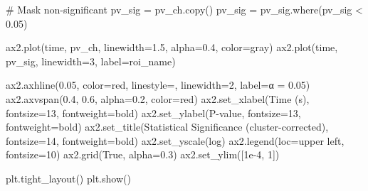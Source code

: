 \documentclass[
  11pt,
  letterpaper,
  oneside,
  openany]{book}
\newenvironment{Shaded}{\begin{snugshade}}{\end{snugshade}}
\newcommand{\CommentTok}[1]{\textcolor[rgb]{0.37,0.37,0.37}{#1}}
\newcommand{\DecValTok}[1]{\textcolor[rgb]{0.68,0.00,0.00}{#1}}
\newcommand{\FloatTok}[1]{\textcolor[rgb]{0.68,0.00,0.00}{#1}}
\newcommand{\NormalTok}[1]{\textcolor[rgb]{0.00,0.23,0.31}{#1}}
\newcommand{\OperatorTok}[1]{\textcolor[rgb]{0.37,0.37,0.37}{#1}}
\newcommand{\StringTok}[1]{\textcolor[rgb]{0.13,0.47,0.30}{#1}}
\newcommand{\VariableTok}[1]{\textcolor[rgb]{0.07,0.07,0.07}{#1}}
\begin{document}
\begin{Shaded}
\begin{Highlighting}[]
    \CommentTok{\# Mask non{-}significant}
\NormalTok{    pv\_sig }\OperatorTok{=}\NormalTok{ pv\_ch.copy()}
\NormalTok{    pv\_sig }\OperatorTok{=}\NormalTok{ pv\_sig.where(pv\_sig }\OperatorTok{\textless{}} \FloatTok{0.05}\NormalTok{)}
    
\NormalTok{    ax2.plot(time, pv\_ch, linewidth}\OperatorTok{=}\FloatTok{1.5}\NormalTok{, alpha}\OperatorTok{=}\FloatTok{0.4}\NormalTok{, color}\OperatorTok{=}\StringTok{\textquotesingle{}gray\textquotesingle{}}\NormalTok{)}
\NormalTok{    ax2.plot(time, pv\_sig, linewidth}\OperatorTok{=}\DecValTok{3}\NormalTok{, label}\OperatorTok{=}\NormalTok{roi\_name)}

\NormalTok{ax2.axhline(}\FloatTok{0.05}\NormalTok{, color}\OperatorTok{=}\StringTok{\textquotesingle{}red\textquotesingle{}}\NormalTok{, linestyle}\OperatorTok{=}\StringTok{\textquotesingle{}{-}{-}\textquotesingle{}}\NormalTok{, linewidth}\OperatorTok{=}\DecValTok{2}\NormalTok{, label}\OperatorTok{=}\StringTok{\textquotesingle{}α = 0.05\textquotesingle{}}\NormalTok{)}
\NormalTok{ax2.axvspan(}\FloatTok{0.4}\NormalTok{, }\FloatTok{0.6}\NormalTok{, alpha}\OperatorTok{=}\FloatTok{0.2}\NormalTok{, color}\OperatorTok{=}\StringTok{\textquotesingle{}red\textquotesingle{}}\NormalTok{)}
\NormalTok{ax2.set\_xlabel(}\StringTok{\textquotesingle{}Time (s)\textquotesingle{}}\NormalTok{, fontsize}\OperatorTok{=}\DecValTok{13}\NormalTok{, fontweight}\OperatorTok{=}\StringTok{\textquotesingle{}bold\textquotesingle{}}\NormalTok{)}
\NormalTok{ax2.set\_ylabel(}\StringTok{\textquotesingle{}P{-}value\textquotesingle{}}\NormalTok{, fontsize}\OperatorTok{=}\DecValTok{13}\NormalTok{, fontweight}\OperatorTok{=}\StringTok{\textquotesingle{}bold\textquotesingle{}}\NormalTok{)}
\NormalTok{ax2.set\_title(}\StringTok{\textquotesingle{}Statistical Significance (cluster{-}corrected)\textquotesingle{}}\NormalTok{, fontsize}\OperatorTok{=}\DecValTok{14}\NormalTok{, fontweight}\OperatorTok{=}\StringTok{\textquotesingle{}bold\textquotesingle{}}\NormalTok{)}
\NormalTok{ax2.set\_yscale(}\StringTok{\textquotesingle{}log\textquotesingle{}}\NormalTok{)}
\NormalTok{ax2.legend(loc}\OperatorTok{=}\StringTok{\textquotesingle{}upper left\textquotesingle{}}\NormalTok{, fontsize}\OperatorTok{=}\DecValTok{10}\NormalTok{)}
\NormalTok{ax2.grid(}\VariableTok{True}\NormalTok{, alpha}\OperatorTok{=}\FloatTok{0.3}\NormalTok{)}
\NormalTok{ax2.set\_ylim([}\FloatTok{1e{-}4}\NormalTok{, }\DecValTok{1}\NormalTok{])}

\NormalTok{plt.tight\_layout()}
\NormalTok{plt.show()}


\end{Highlighting}
\end{Shaded}
\end{document}
